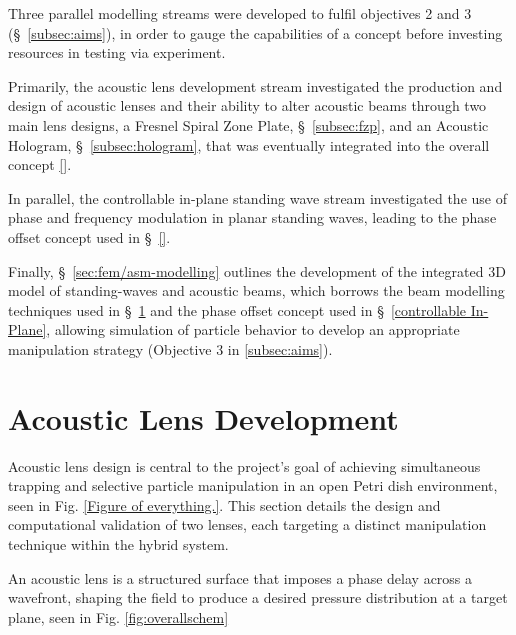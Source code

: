 \documentclass[11pt,a4paper]{article}
\begin{document}

Three parallel modelling streams were developed to fulfil objectives 2 and 3 (\S~\ref{subsec:aims}), in order to gauge the capabilities of a concept before investing resources in testing via experiment. 

Primarily, the acoustic lens development stream investigated the production and design of acoustic lenses and their ability to alter acoustic beams through two main lens designs, a Fresnel Spiral Zone Plate, \S~\ref{subsec:fzp}, and an Acoustic Hologram, \S~\ref{subsec:hologram}, that was eventually integrated into the overall concept \ref{}. 

In parallel, the controllable in-plane standing wave stream investigated the use of phase and frequency modulation in planar standing waves, leading to the phase offset concept used in \S~\ref{}. 

Finally, \S~\ref{sec:fem/asm-modelling} outlines the development of the integrated 3D model of standing-waves and acoustic beams, which borrows the beam modelling techniques used in \S~\ref{sec:acoustic-lens-dev} and the phase offset concept used in \S~\ref{controllable In-Plane}, allowing simulation of particle behavior to develop an appropriate manipulation strategy (Objective 3 in \ref{subsec:aims}). 


\section{Acoustic Lens Development}
\label{sec:acoustic-lens-dev}

Acoustic lens design is central to the project's goal of achieving simultaneous trapping and selective particle manipulation in an open Petri dish environment, seen in Fig. \ref{Figure of everything.}. This section details the design and computational validation of two lenses, each targeting a distinct manipulation technique within the hybrid system. 

An acoustic lens is a structured surface that imposes a phase delay across a wavefront, shaping the field to produce a desired pressure distribution at a target plane, seen in Fig. \ref{fig:overallschem}
\end{document}
